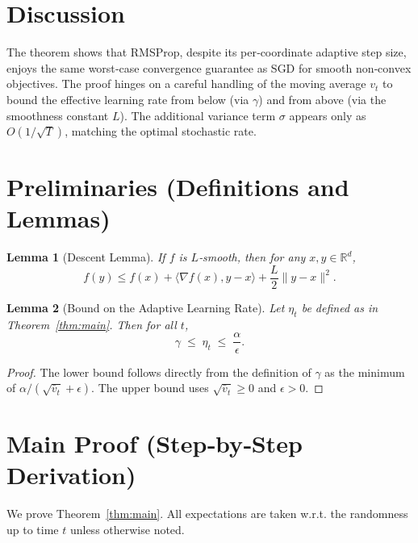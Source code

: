 \documentclass[11pt]{article}
\newtheorem{lemma}{Lemma}
\newcommand{\R}{\mathbb{R}}
\begin{document}
\section*{Discussion}
The theorem shows that RMSProp, despite its per‑coordinate adaptive step size, enjoys the same worst‑case convergence guarantee as SGD for smooth non‑convex objectives. The proof hinges on a careful handling of the moving average $v_t$ to bound the effective learning rate from below (via $\gamma$) and from above (via the smoothness constant $L$). The additional variance term $\sigma$ appears only as $O(1/\sqrt{T})$, matching the optimal stochastic rate.

\newpage
\section*{Preliminaries (Definitions and Lemmas)}
\begin{lemma}[Descent Lemma]\label{lem:descent}
If $f$ is $L$‑smooth, then for any $x,y\in\R^{d}$,
\[
f(y)\le f(x)+\langle\nabla f(x),y-x\rangle+\frac{L}{2}\|y-x\|^2.
\]
\end{lemma}
\begin{lemma}[Bound on the Adaptive Learning Rate]\label{lem:eta}
Let $\eta_t$ be defined as in Theorem~\ref{thm:main}. Then for all $t$,
\[
\gamma\;\le\;\eta_t\;\le\;\frac{\alpha}{\epsilon}.
\]
\end{lemma}
\begin{proof}
The lower bound follows directly from the definition of $\gamma$ as the minimum of $\alpha/(\sqrt{\bar v_t}+\epsilon)$.  
The upper bound uses $\sqrt{\bar v_t}\ge0$ and $\epsilon>0$.
\end{proof}

\section*{Main Proof (Step‑by‑Step Derivation)}
We prove Theorem~\ref{thm:main}. All expectations are taken w.r.t. the randomness up to time $t$ unless otherwise noted.
\end{document}

